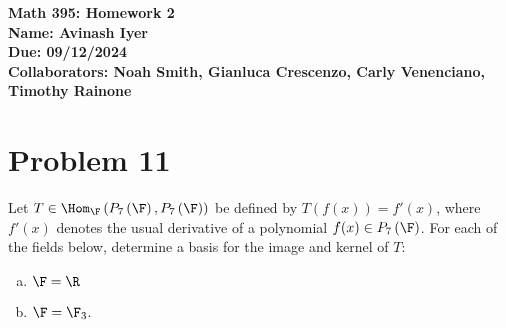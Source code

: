 \documentclass[12pt]{mypackage}
\begin{document}
\RaggedRight
\begin{center}
  \bfseries
  Math 395: Homework 2\\
  Name: Avinash Iyer\\
  Due: 09/12/2024\\
  Collaborators: Noah Smith, Gianluca Crescenzo, Carly Venenciano, Timothy Rainone
\end{center}
\section{Problem 11}%
\begin{problem}
  Let $T\in \Hom_{\F}\left(P_7\left(\F\right),P_{7}\left(\F\right)\right)$ be defined by $T\left(f(x)\right) = f'(x)$, where $f'(x)$ denotes the usual derivative of a polynomial $f(x)\in P_{7}\left(\F\right)$. For each of the fields below, determine a basis for the image and kernel of $T$:
  \begin{enumerate}[(a)]
    \item $\F = \R$
    \item $\F = \F_{3}$.
  \end{enumerate}
\end{problem}
\end{document}
